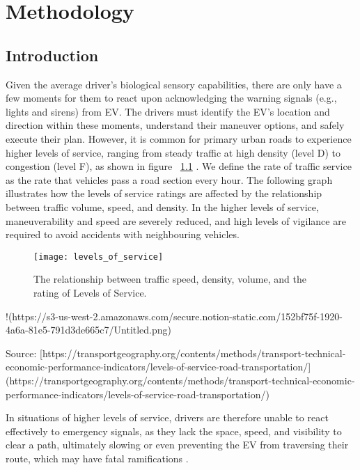\chapter{Methodology}

\section{Introduction}

Given the average driver's biological sensory capabilities, there are only have a few moments for them to react upon acknowledging the warning signals (e.g., lights and sirens) from \acrshort{EV}. The drivers must identify the \acrshort{EV}'s location and direction within these moments, understand their maneuver options, and safely execute their plan. However, it is common for primary urban roads to experience higher levels of service, ranging from steady traffic at high density (level D) to congestion (level F), as shown in figure ~\ref{fig:levels_of_service} \cite{archer_2005, traffic_data_computation_method_2018}. We define the rate of traffic service as the rate that vehicles pass a road section every hour. The following graph illustrates how the levels of service ratings are affected by the relationship between traffic volume, speed, and density. In the higher levels of service, maneuverability and speed are severely reduced, and high levels of vigilance are required to avoid accidents with neighbouring vehicles.

\begin{figure}
\texttt{[image: levels\_of\_service]}
\caption{The relationship between traffic speed, density, volume, and the rating of Levels of Service.}
\label{fig:levels_of_service}
\end{figure}

!\cite{Untitled}(https://s3-us-west-2.amazonaws.com/secure.notion-static.com/152bf75f-1920-4a6a-81e5-791d3de665c7/Untitled.png)

Source: [https://transportgeography.org/contents/methods/transport-technical-economic-performance-indicators/levels-of-service-road-transportation/](https://transportgeography.org/contents/methods/transport-technical-economic-performance-indicators/levels-of-service-road-transportation/)

In situations of higher levels of service, drivers are therefore unable to react effectively to emergency signals, as they lack the space, speed, and visibility to clear a path, ultimately slowing or even preventing the \acrshort{EV} from traversing their route, which may have fatal ramifications \cite{Hsiao2018, Buchenscheit2009, Vlad2008, Sukru2020}.

